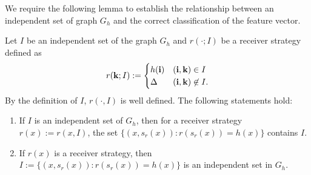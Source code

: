 We require the following lemma to establish the relationship between an independent set of graph $G_h$ and the correct classification of the feature vector.

\begin{lem}\label{lem:1-1 correspondance between independence set and recoverable feature vector}
	Let $I$ be an independent set of the graph $G_h$ and $r(\cdot;I)$ be a receiver strategy defined as
	\begin{equation*}
		r(\mathbf{k};I) := \begin{cases}
			h(\mathbf{i}) & (\mathbf{i},\mathbf{k}) \in I\\
			\Delta & (\mathbf{i},\mathbf{k}) \not\in I.
		\end{cases}
	\end{equation*}
    By the definition of $I$, $r(\cdot,I)$ is well defined. The following statements hold:
	\begin{enumerate}[label=(\alph*)]
		\item If $I$ is an independent set of $G_h$, then for a receiver strategy $r(x) := r(x,I)$, the set $\{(x,s_r(x)): r(s_r(x)) = h(x)\}$ contains $I$.
		\item If $r(x)$ is a receiver strategy, then $I := \{(x,s_r(x)): r(s_r(x)) = h(x)\}$ is an  independent set in $G_h$. 
	\end{enumerate}
\end{lem}

